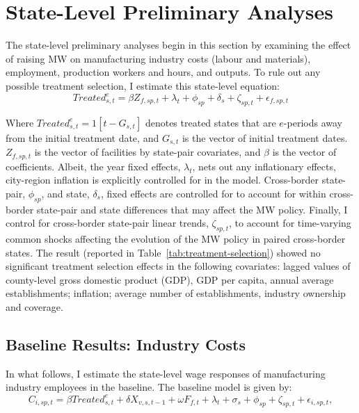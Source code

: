 \documentclass[numsec,webpdf,contemporary,large,namedate]{oup-authoring-template}%
\begin{document}
    \section{State-Level Preliminary Analyses}\label{sec:state-level-preliminary-analyses}
    The state-level preliminary analyses begin in this section by examining the effect of raising MW on manufacturing industry costs (labour and materials), employment, production workers and hours, and outputs. To rule out any possible treatment selection, I estimate this state-level equation:
    \begin{equation}
        Treated_{s,t}^e = \beta Z_{f,sp,t} + \lambda_{t} + \phi_{sp} + \delta_{s} + \zeta_{sp,t} + \epsilon_{f,sp,t}\label{eq:treatment-selection}
    \end{equation}

    Where $Treated_{s,t}^e = 1[t - G_{s,t}]$ denotes treated states that are $e$-periods away from the initial treatment date, and $G_{s,t}$ is the vector of initial treatment dates. $Z_{f,sp,t}$ is the vector of facilities by state-pair covariates, and $\beta$ is the vector of coefficients. Albeit, the year fixed effects, $\lambda_{t}$, nets out any inflationary effects, city-region inflation is explicitly controlled for in the model. Cross-border state-pair, $\phi_{sp}$, and state, $\delta_{s}$, fixed effects are controlled for to account for within cross-border state-pair and state differences that may affect the MW policy. Finally, I control for cross-border state-pair linear trends, $\zeta_{sp,t}$, to account for time-varying common shocks affecting the evolution of the MW policy in paired cross-border states. The result (reported in Table~\ref{tab:treatment-selection}) showed no significant treatment selection effects in the following covariates: lagged values of county-level gross domestic product (GDP), GDP per capita, annual average establishments; inflation; average number of establishments, industry ownership and coverage.
    

    \subsection{Baseline Results: Industry Costs}\label{subsec:baseline-results-industry-costs}
    In what follows, I estimate the state-level wage responses of manufacturing industry employees in the baseline. The baseline model is given by:
    \begin{equation}
        C_{i,sp,t} = \beta Treated_{s,t}^e + \delta X_{v,s,t-1} + \omega F_{f,t} + \lambda_{t} + \sigma_{s} + \phi_{sp} + \zeta_{sp,t} + \epsilon_{i,sp,t},\label{eq:baseline-wages}
    \end{equation}
\end{document}
